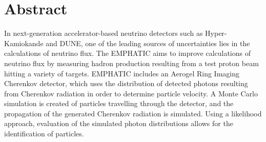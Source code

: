 
\chapter{Abstract}

In next-generation accelerator-based neutrino detectors such as Hyper-Kamiokande and DUNE, one of the leading sources of uncertainties lies in the calculations of neutrino flux. The \ac{EMPHATIC} aims to improve calculations of neutrino flux by measuring hadron production resulting from a test proton beam hitting a variety of targets. \ac{EMPHATIC} includes an Aerogel Ring Imaging Cherenkov detector, which uses the distribution of detected photons resulting from Cherenkov radiation in order to determine particle velocity. A Monte Carlo simulation is created of particles travelling through the detector, and the propagation of the generated Cherenkov radiation is simulated. Using a likelihood approach, evaluation of the simulated photon distributions allows for the identification of particles.

\vfill
\begin{center}
\begin{sf}
\end{sf}
\end{center}
